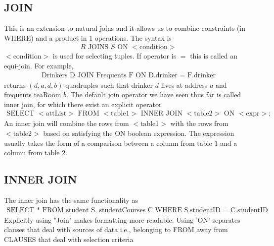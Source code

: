 \documentclass[a4paper]{article}
\theoremstyle{plain}
\theoremstyle{definition}
\theoremstyle{remark}
\begin{document}
\subsection{JOIN}
This is an extension to natural joins and it allows us to combine constraints (in WHERE) and a product in 1 operations. The syntax is
\begin{align*}
	R \text{ JOINS } S \text{ ON }<\text{condition}>
\end{align*}
$<\text{condition}>$ is used for selecting tuples. If operator is $=$ this is called an equi-join. For example,
\begin{align*}
	\text{Drinkers D JOIN Frequents F ON D.drinker = F.drinker}
\end{align*}
returns $(d,a,d,b)$ quadruples such that drinker $d$ lives at address $a$ and frequents teaRoom $b$.
The default join operator we have seen thus far is called inner join, for which there exist an explicit operator
\begin{align*}
	\text{SELECT } <\text{attList}> \text{ FROM } <\text{table1}> \text{ INNER JOIN } <\text{table2}> \text{ ON } <\text{expr}>;
\end{align*}
An inner join will combine the rows from $<\text{table1}>$ with the rows from $<\text{table2}>$ based on satisfying the ON boolean expression. The expression usually takes the form of a comparison between a column from table $1$ and a column from table $2$.
\subsection{INNER JOIN}
The inner join has the same functionality as
\begin{align*}
	\text{SELECT }*\text{ FROM student S, studentCourses C WHERE S.studentID = C.studentID}
\end{align*}
Explicitly using "Join" makes formatting more readable. Using 'ON' separates clauses that deal with sources of data i.e., belonging to FROM away from CLAUSES that deal with selection criteria
\end{document}
